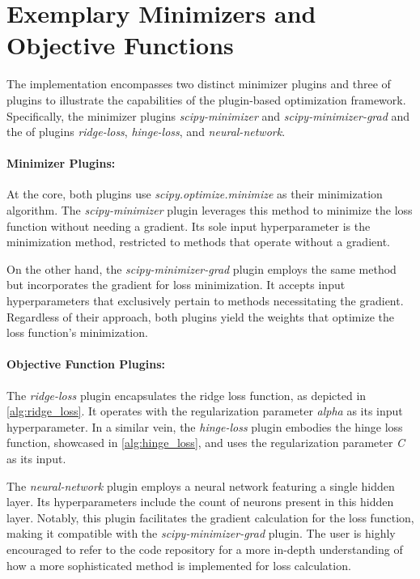 \documentclass[
  a4paper,  %
  twoside,  %
  bibliography=totoc,
  headsepline,
  cleardoublepage=empty,
  parskip=half,
  draft=false
]{scrbook}
\begin{document}
\section{Exemplary Minimizers and Objective Functions}
\label{sec:exampleMinimizersAndObjectiveFunctions}

The implementation encompasses two distinct minimizer plugins and three \gls{of} plugins to illustrate the capabilities of the plugin-based optimization framework.
Specifically, the minimizer plugins \emph{scipy-minimizer} and \emph{scipy-minimizer-grad} and the \gls{of} plugins \emph{ridge-loss}, \emph{hinge-loss}, and \emph{neural-network}.

\paragraph{Minimizer Plugins:}
\label{sec:minimizerPlugins}

At the core, both plugins use \emph{scipy.optimize.minimize} as their minimization algorithm.
The \emph{scipy-minimizer} plugin leverages this method to minimize the loss function without needing a gradient.
Its sole input hyperparameter is the minimization method, restricted to methods that operate without a gradient.

On the other hand, the \emph{scipy-minimizer-grad} plugin employs the same method but incorporates the gradient for loss minimization.
It accepts input hyperparameters that exclusively pertain to methods necessitating the gradient.
Regardless of their approach, both plugins yield the weights that optimize the loss function's minimization.

\paragraph{Objective Function Plugins:}
\label{sec:objectiveFunctionPlugins}

The \emph{ridge-loss} plugin encapsulates the ridge loss function, as depicted in \ref{alg:ridge_loss}.
It operates with the regularization parameter \emph{alpha} as its input hyperparameter.
In a similar vein, the \emph{hinge-loss} plugin embodies the hinge loss function, showcased in \ref{alg:hinge_loss}, and uses the regularization parameter \emph{C} as its input.

The \emph{neural-network} plugin employs a neural network featuring a single hidden layer.
Its hyperparameters include the count of neurons present in this hidden layer.
Notably, this plugin facilitates the gradient calculation for the loss function, making it compatible with the \emph{scipy-minimizer-grad} plugin.
The user is highly encouraged to refer to the code repository for a more in-depth understanding of how a more sophisticated method is implemented for loss calculation.
\end{document}
